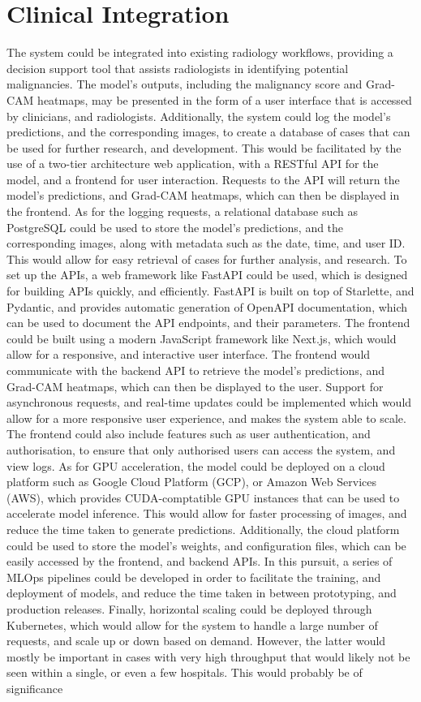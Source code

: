 \documentclass[../main]{subfiles}
\begin{document}
\section{Clinical Integration}
The system could be integrated into existing radiology workflows, providing a decision support tool that assists radiologists in identifying potential malignancies. The model's outputs, including the malignancy score and Grad-CAM heatmaps, may be presented in the form of a user interface that is accessed by clinicians, and radiologists. Additionally, the system could log the model's predictions, and the corresponding images, to create a database of cases that can be used for further research, and development. This would be facilitated by the use of a two-tier architecture web application, with a RESTful API for the model, and a frontend for user interaction. Requests to the API will return the model's predictions, and Grad-CAM heatmaps, which can then be displayed in the frontend. As for the logging requests, a relational database such as PostgreSQL could be used to store the model's predictions, and the corresponding images, along with metadata such as the date, time, and user ID. This would allow for easy retrieval of cases for further analysis, and research. To set up the APIs, a web framework like FastAPI could be used, which is designed for building APIs quickly, and efficiently. FastAPI is built on top of Starlette, and Pydantic, and provides automatic generation of OpenAPI documentation, which can be used to document the API endpoints, and their parameters. The frontend could be built using a modern JavaScript framework like Next.js, which would allow for a responsive, and interactive user interface. The frontend would communicate with the backend API to retrieve the model's predictions, and Grad-CAM heatmaps, which can then be displayed to the user. Support for asynchronous requests, and real-time updates could be implemented which would allow for a more responsive user experience, and makes the system able to scale. The frontend could also include features such as user authentication, and authorisation, to ensure that only authorised users can access the system, and view logs. As for GPU acceleration, the model could be deployed on a cloud platform such as Google Cloud Platform (GCP), or Amazon Web Services (AWS), which provides CUDA-comptatible GPU instances that can be used to accelerate model inference. This would allow for faster processing of images, and reduce the time taken to generate predictions. Additionally, the cloud platform could be used to store the model's weights, and configuration files, which can be easily accessed by the frontend, and backend APIs. In this pursuit, a series of MLOps pipelines could be developed in order to facilitate the training, and deployment of models, and reduce the time taken in between prototyping, and production releases. Finally, horizontal scaling could be deployed through Kubernetes, which would allow for the system to handle a large number of requests, and scale up or down based on demand. However, the latter would mostly be important in cases with very high throughput that would likely not be seen within a single, or even a few hospitals. This would probably be of significance 
\end{document}
